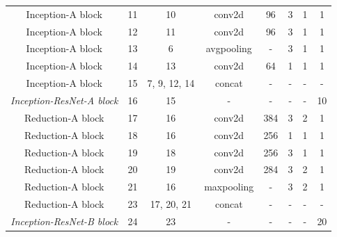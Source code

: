 \documentclass[12pt]{article}
\numberwithin{equation}{section}
\numberwithin{figure}{section}
\begin{document}
\begin{table}[]
{\begin{tabular}{c|c|c|c|c|c|c|c}
	Inception-A block                 & 11               & 10             & conv2d            & 96               & 3              & 1                      & 1          \\
	Inception-A block                 & 12               & 11             & conv2d            & 96               & 3              & 1                      & 1          \\
	Inception-A block                 & 13               & 6              & avgpooling        & -                & 3              & 1                      & 1          \\
	Inception-A block                 & 14               & 13             & conv2d            & 64               & 1              & 1                      & 1          \\
	Inception-A block                 & 15               & 7, 9, 12, 14   & concat            & -                & -              & -                      & -          \\\hdashline
	\textit{Inception-ResNet-A block} & 16               & 15             & -                 & -                & -              & -                      & 10         \\\hdashline
	Reduction-A block                 & 17               & 16             & conv2d            & 384              & 3              & 2                      & 1          \\
	Reduction-A block                 & 18               & 16             & conv2d            & 256              & 1              & 1                      & 1          \\
	Reduction-A block                 & 19               & 18             & conv2d            & 256              & 3              & 1                      & 1          \\
	Reduction-A block                 & 20               & 19             & conv2d            & 284              & 3              & 2                      & 1          \\
	Reduction-A block                 & 21               & 16             & maxpooling        & -                & 3              & 2                      & 1          \\
	Reduction-A block                 & 23               & 17, 20, 21     & concat            & -                & -              & -                      & -          \\\hdashline
	\textit{Inception-ResNet-B block} & 24               & 23             & -                 & -                & -              & -                      & 20         \\

\end{tabular}}
\end{table}
\end{document}
